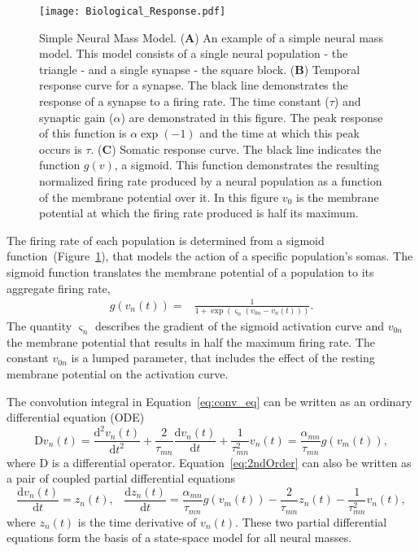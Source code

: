 \begin{figure}
	\centering
		\texttt{[image: Biological\_Response.pdf]}
	\caption{Simple Neural Mass Model. (\textbf{A}) An example of a simple neural mass model. This model consists of a single neural population - the triangle - and a single synapse - the square block. (\textbf{B}) Temporal response curve for a synapse. The black line demonstrates the response of a synapse to a firing rate. The time constant ($\tau$) and synaptic gain ($\alpha$) are demonstrated in this figure. The peak response of this function is $\alpha \exp(-1)$ and the time at which this peak occurs is $\tau$. (\textbf{C}) Somatic response curve. The black line indicates the function $g(v)$, a sigmoid. This function demonstrates the resulting normalized firing rate produced by a neural population as a function of the membrane potential over it. In this figure $v_{0}$ is the membrane potential at which the firing rate produced is half its maximum.}
	\label{fig: Simple}
\end{figure}

The firing rate of each population is determined from a sigmoid function~(Figure~\ref{fig: Simple}), that models the action of a specific population's somas. The sigmoid function translates the membrane potential of a population to its aggregate firing rate,
\begin{align}\label{eq:sigmoid}
    g\left(v_n(t)\right) =& \frac{1}{1+\exp{\left(\varsigma_n\left(v_{0n} - v_n(t)\right)\right)}}.
\end{align}
The quantity $\varsigma_n$ describes the gradient of the sigmoid activation curve and $v_{0n}$ the membrane potential that results in half the maximum firing rate. The constant $v_{0n}$ is a lumped parameter, that includes the effect of the resting membrane potential on the activation curve. 

The convolution integral in Equation~\ref{eq:conv_eq} can be written as an ordinary differential equation (ODE)
\begin{equation}\label{eq:2ndOrder}
    \mathrm{D}v_n(t) = \frac{\mathrm{d}^2 v_n(t)}{\mathrm{d}t^2} + \frac{2}{\tau_{mn}}\frac{\mathrm{d} v_n(t)}{\mathrm{d}t} + \frac{1}{\tau_{mn}^2} v_n(t) = \frac{\alpha_{mn}}{\tau_{mn}} g(v_m(t)),
\end{equation}
where $\mathrm{D}$ is a differential operator. Equation~\ref{eq:2ndOrder} can also be written as a pair of coupled partial differential equations
\begin{equation} \label{eq:2ndOrderNMM}
    \frac{\mathrm{d} v_n(t)}{\mathrm{d}t} = z_n(t),\,\,\,\,\,    \frac{\mathrm{d}z_n(t)}{\mathrm{d}t} = \frac{\alpha_{mn}}{\tau_{mn}} g(v_m(t)) - \frac{2}{\tau_{mn}}z_n(t) - \frac{1}{\tau_{mn}^2} v_n(t),
\end{equation}
where $z_n(t)$ is the time derivative of $v_n(t)$. These two partial differential equations form the basis of a state-space model for all neural masses.

